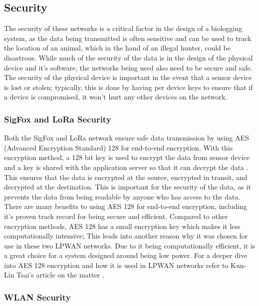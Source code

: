 \documentclass[sigplan,screen,nonacm]{acmart}
\begin{document}
\subsection{Security}
\label{subsec:Security}

The security of these networks is a critical factor in the design of a biologging system, as 
the data being transmitted is often sensitive and can be used to track the location of an animal, 
which in the hand of an illegal hunter, could be disastrous. While much of the security of the 
data is in the design of the physical device and it's software, the networks being used also need to 
be secure and safe. The security of the physical device is important in the event that a sensor 
device is lost or stolen; typically, this is done by having per device keys to ensure that if a 
device is compromised, it won't hurt any other devices on the network.

\subsubsection{SigFox and LoRa Security}
\label{subsec:SigFox and LoRa Security}

Both the SigFox and LoRa network ensure safe data transmission by using AES (Advanced Encryption Standard) 
128 for end-to-end encryption. With this encryption method, a 128 bit key is used to encrypt the data from 
sensor device and a key is shared with the application server so that it can decrypt the data \cite{AES128IoT}. 
This ensures that the data is encrypted at the source, encrypted in transit, and decrypted at the destination. 
This is important for the security of the data, as it prevents the data 
from being readable by anyone who has access to the data. There are many benefits to using AES 128 for end-to-end encryption, including 
it's proven track record for being secure and efficient. Compared to other encryption methods, AES 128 
has a small encryption key which makes it less computationally intensive; This leads into another reason why 
it was chosen for use in these two LPWAN networks. Due to it being computationally efficient, it is 
a great choice for a system designed around being low power. For a deeper dive into AES 128 encryption and 
how it is used in LPWAN networks refer to Kun-Lin Tsai's article on the matter \cite{AES128IoT}.

\subsubsection{WLAN Security}
\label{subsec:WLAN Security}
\end{document}
